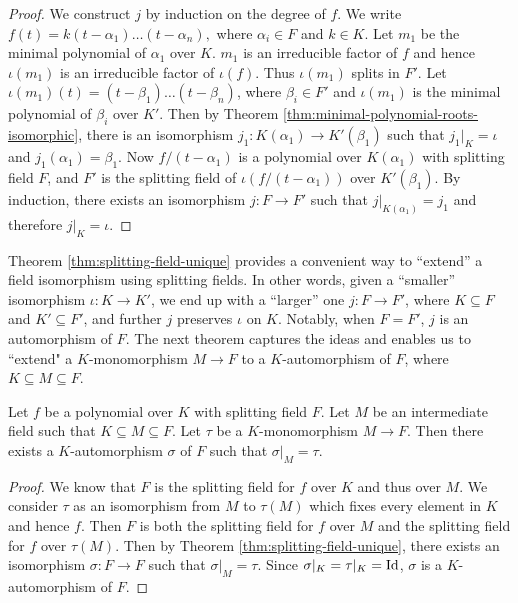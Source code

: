 \begin{proof}
	We construct $j$ by induction on the degree of $f$. We write $ f(t) = k (t - \alpha_1) \ldots (t - \alpha_n), $ where $\alpha_i \in F$ and $k \in K$. Let $m_1$ be the minimal polynomial of $\alpha_1$ over $K$. $m_1$ is an irreducible factor of $f$ and hence $\iota(m_1)$ is an irreducible factor of $\iota(f)$. Thus $\iota(m_1)$ splits in $F'$. Let $\iota(m_1)(t) = (t - \beta_1) \ldots (t - \beta_n)$, where $\beta_i \in F'$ and $\iota(m_1)$ is the minimal polynomial of $\beta_i$ over $K'$. Then by Theorem \ref{thm:minimal-polynomial-roots-isomorphic}, there is an isomorphism $j_1 : K(\alpha_1) \to K'(\beta_1)$ such that $j_1 | _K = \iota$ and $j_1(\alpha_1) = \beta_1$. Now $f / (t - \alpha_1)$ is a polynomial over $K(\alpha_1)$ with splitting field $F$, and $F'$ is the splitting field of $\iota(f / (t - \alpha_1))$ over $K'(\beta_1)$. By induction, there exists an isomorphism $j: F \to F'$ such that $j | _{K(\alpha_1)} = j_1$ and therefore $j | _K = \iota$. 
\end{proof}



Theorem \ref{thm:splitting-field-unique} provides a convenient way to ``extend'' a field isomorphism using splitting fields. In other words, given a ``smaller'' isomorphism $\iota: K \to K'$, we end up with a ``larger'' one $j: F \to F'$, where $K \subseteq F$ and $K' \subseteq F'$, and further $j$ preserves $\iota$ on $K$. Notably, when $F  = F'$, $j$ is an automorphism of $F$. The next theorem captures the ideas and enables us to ``extend" a $K$-monomorphism $M \to F$ to a $K$-automorphism of $F$, where $K \subseteq M \subseteq F$. 

\begin{theorem} \label{thm:monomorphism-extend-automorphism}
	Let $f$ be a polynomial over $K$ with splitting field $F$. Let $M$ be an intermediate field such that $K \subseteq M \subseteq F$. Let $\tau$ be a $K$-monomorphism $M \to F$. Then there exists a $K$-automorphism $\sigma$ of $F$ such that $\sigma | _M = \tau$.  
\end{theorem}

\begin{proof}
	We know that $F$ is the splitting field for $f$ over $K$ and thus over $M$. We consider $\tau$ as an isomorphism from $M$ to $\tau(M)$ which fixes every element in $K$ and hence $f$. Then $F$ is both the splitting field for $f$ over $M$ and the splitting field for $f$ over $\tau(M)$. Then by Theorem \ref{thm:splitting-field-unique}, there exists an isomorphism $\sigma: F \to F$ such that $\sigma | _M = \tau$. Since $\sigma | _K = \tau |_K = \operatorname{Id}$, $\sigma$ is a $K$-automorphism of $F$. 
\end{proof}

